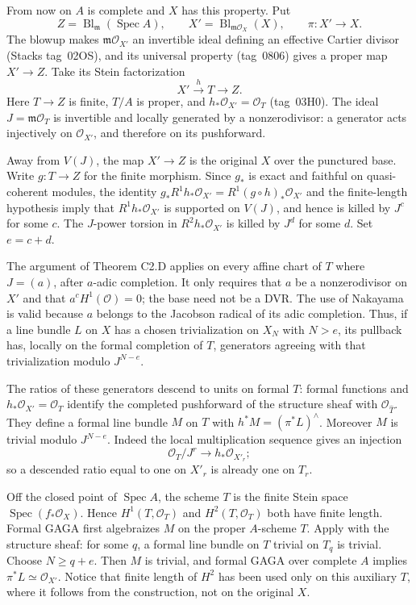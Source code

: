 From now on $A$ is complete and $X$ has this property. Put
\[
 Z=\operatorname{Bl}_{\mathfrak m}(\operatorname{Spec}A),\qquad
 X'=\operatorname{Bl}_{\mathfrak m\mathcal O_X}(X),\qquad
 \pi:X'\to X.
\]
The blowup makes $\mathfrak m\mathcal O_{X'}$ an invertible ideal defining
an effective Cartier divisor (Stacks tag~02OS), and its universal property
(tag~0806) gives a proper map $X'\to Z$. Take its Stein factorization
\[
 X'\xrightarrow{h}T\longrightarrow Z.
\]
Here $T\to Z$ is finite, $T/A$ is proper, and
$h_*\mathcal O_{X'}=\mathcal O_T$ (tag~03H0). The ideal
$J=\mathfrak m\mathcal O_T$ is invertible and locally generated by a
nonzerodivisor: a generator acts injectively on $\mathcal O_{X'}$, and
therefore on its pushforward.

Away from $V(J)$, the map $X'\to Z$ is the original $X$ over the punctured
base. Write $g:T\to Z$ for the finite morphism. Since $g_*$ is exact and
faithful on quasi-coherent modules, the identity
$g_*R^1h_*\mathcal O_{X'}=R^1(g\circ h)_*\mathcal O_{X'}$ and the
finite-length hypothesis imply that $R^1h_*\mathcal O_{X'}$ is supported
on $V(J)$, and hence is killed
by $J^c$ for some $c$. The $J$-power torsion in
$R^2h_*\mathcal O_{X'}$ is killed by $J^d$ for some $d$.
Set $e=c+d$.

The argument of Theorem C2.D applies on every affine chart of $T$ where
$J=(a)$, after $a$-adic completion. It only requires that $a$ be a
nonzerodivisor on $X'$ and that $a^cH^1(\mathcal O)=0$; the base need not
be a DVR. The use of Nakayama is valid because $a$ belongs to the Jacobson
radical of its adic completion. Thus, if a line bundle $L$ on $X$ has a
chosen trivialization on $X_N$ with $N>e$, its pullback has, locally on
the formal completion of $T$, generators agreeing with that trivialization
modulo $J^{N-e}$.

The ratios of these generators descend to units on formal $T$: formal
functions and $h_*\mathcal O_{X'}=\mathcal O_T$ identify the completed
pushforward of the structure sheaf with $\mathcal O_{\widehat T}$.
They define a formal line bundle $M$ on $T$ with
$h^*M=(\pi^*L)^{\wedge}$. Moreover $M$ is trivial modulo $J^{N-e}$.
Indeed the local multiplication sequence gives an injection
\[
 \mathcal O_T/J^r\longrightarrow h_*\mathcal O_{X'_r};
\]
so a descended ratio equal to one on $X'_r$ is already one on $T_r$.

Off the closed point of $\operatorname{Spec}A$, the scheme $T$ is the
finite Stein space $\operatorname{Spec}(f_*\mathcal O_X)$. Hence
$H^1(T,\mathcal O_T)$ and $H^2(T,\mathcal O_T)$ both have finite length.
Formal GAGA first algebraizes $M$ on the proper $A$-scheme $T$.
Apply \cite[Proposition~1.2 and the proof of Theorem~1.1]{PerlingSchroer2017}
with the structure sheaf: for some $q$, a formal line bundle on $T$ trivial
on $T_q$ is trivial. Choose $N\geq q+e$. Then $M$ is trivial, and formal
GAGA over complete $A$ implies $\pi^*L\simeq\mathcal O_{X'}$.
Notice that finite length of $H^2$ has been used only on this auxiliary
$T$, where it follows from the construction, not on the original $X$.

